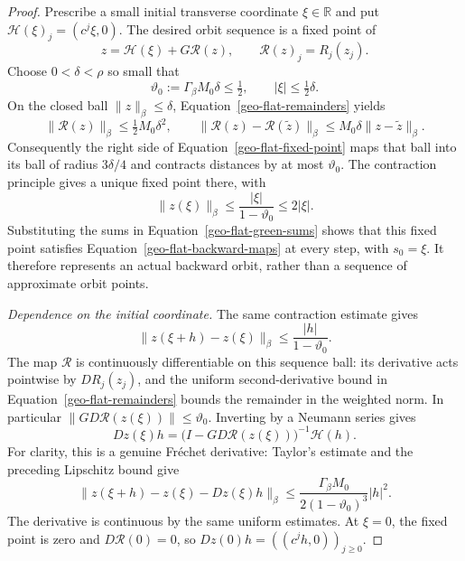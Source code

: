 \begin{proof}
Prescribe a small initial transverse coordinate $\xi\in\mathbb R$ and
put $\mathcal H(\xi)_j=(c^j\xi,0)$.  The desired orbit sequence is a fixed point of
\begin{equation}
\label{geo-flat-fixed-point}
 z=\mathcal H(\xi)+G\mathcal R(z),\qquad
 \mathcal R(z)_j=R_j(z_j).
\end{equation}
Choose $0<\delta<\rho$ so small that
\begin{equation}
\label{geo-flat-parameter-choice}
 \vartheta_0:=\Gamma_\beta M_0\delta\leq\tfrac12,
 \qquad \lvert\xi\rvert\leq\tfrac12\delta.
\end{equation}
On the closed ball $\lVert z\rVert_\beta\leq\delta$,
Equation~\eqref{geo-flat-remainders} yields
\[
 \lVert\mathcal R(z)\rVert_\beta\leq\tfrac12 M_0\delta^2,
 \qquad
 \lVert\mathcal R(z)-\mathcal R(\widetilde z)\rVert_\beta
 \leq M_0\delta\lVert z-\widetilde z\rVert_\beta.
\]
Consequently the right side of Equation~\eqref{geo-flat-fixed-point}
maps that ball into its ball of radius $3\delta/4$ and contracts
distances by at most $\vartheta_0$.  The contraction principle gives a unique
fixed point there, with
\begin{equation}
\label{geo-flat-sequence-decay}
 \lVert z(\xi)\rVert_\beta
 \leq\frac{\lvert\xi\rvert}{1-\vartheta_0}\leq2\lvert\xi\rvert.
\end{equation}
Substituting the sums in Equation~\eqref{geo-flat-green-sums} shows that
this fixed point satisfies Equation~\eqref{geo-flat-backward-maps} at
every step, with $s_0=\xi$.  It therefore represents an actual backward
orbit, rather than a sequence of approximate orbit points.

\emph{Dependence on the initial coordinate.}
The same contraction estimate gives
\[
 \lVert z(\xi+h)-z(\xi)\rVert_\beta
 \leq\frac{\lvert h\rvert}{1-\vartheta_0}.
\]
The map $\mathcal R$ is continuously differentiable on this sequence
ball: its derivative acts pointwise by $DR_j(z_j)$, and the uniform
second-derivative bound in Equation~\eqref{geo-flat-remainders} bounds
the remainder in the weighted norm.  In particular
$\lVert G D\mathcal R(z(\xi))\rVert\leq \vartheta_0$.  Inverting by a
Neumann series gives
\begin{equation}
\label{geo-flat-parameter-derivative}
 Dz(\xi)h
 =\bigl(I-GD\mathcal R(z(\xi))\bigr)^{-1}\mathcal H(h).
\end{equation}
For clarity, this is a genuine Fr\'echet derivative: Taylor's estimate
and the preceding Lipschitz bound give
\[
 \bigl\lVert z(\xi+h)-z(\xi)-Dz(\xi)h\bigr\rVert_\beta
 \leq\frac{\Gamma_\beta M_0}{2(1-\vartheta_0)^3}\lvert h\rvert^2.
\]
The derivative is continuous by the same uniform estimates.
At $\xi=0$, the fixed point is zero and $D\mathcal R(0)=0$, so
$Dz(0)h=((c^jh,0))_{j\geq0}$.


\end{proof}

